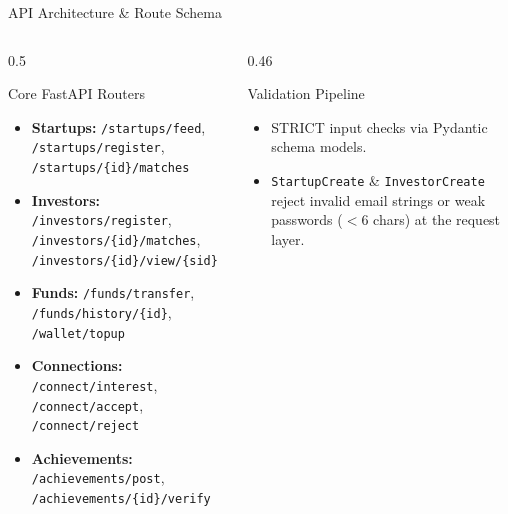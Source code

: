 \documentclass[aspectratio=169, 10pt]{beamer}
\begin{document}
\begin{frame}{API Architecture \& Route Schema}
  \begin{columns}[T]
    \begin{column}{0.5\textwidth}
      \begin{scard}{Core FastAPI Routers}
        \begin{itemize}
          \item \textbf{Startups:} \texttt{/startups/feed}, \texttt{/startups/register}, \texttt{/startups/\{id\}/matches}
          \item \textbf{Investors:} \texttt{/investors/register}, \texttt{/investors/\{id\}/matches}, \texttt{/investors/\{id\}/view/\{sid\}}
          \item \textbf{Funds:} \texttt{/funds/transfer}, \texttt{/funds/history/\{id\}}, \texttt{/wallet/topup}
          \item \textbf{Connections:} \texttt{/connect/interest}, \texttt{/connect/accept}, \texttt{/connect/reject}
          \item \textbf{Achievements:} \texttt{/achievements/post}, \texttt{/achievements/\{id\}/verify}
        \end{itemize}
      \end{scard}
    \end{column}
    \begin{column}{0.46\textwidth}
      \begin{scard}{Validation Pipeline}
        \begin{itemize}
          \item STRICT input checks via Pydantic schema models.
          \item \texttt{StartupCreate} \& \texttt{InvestorCreate} reject invalid email strings or weak passwords ($<$6 chars) at the request layer.
        \end{itemize}
      \end{scard}
    \end{column}
  \end{columns}
\end{frame}
\end{document}
